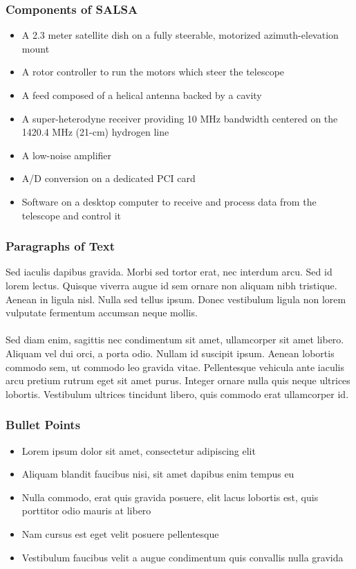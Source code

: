 \documentclass{beamer}
\begin{document}
\begin{frame}
\frametitle{Components of SALSA}
\begin{itemize}
\item A 2.3 meter satellite dish on a fully steerable, motorized azimuth-elevation mount
\item A rotor controller to run the motors which steer the telescope
\item A feed composed of a helical antenna backed by a cavity
\item A super-heterodyne receiver providing 10 MHz bandwidth centered on the 1420.4 MHz (21-cm) hydrogen line
\item A low-noise amplifier
\item A/D conversion on a dedicated PCI card
\item Software on a desktop computer to receive and process data from the telescope and control it
\end{itemize}
\end{frame}

\begin{frame}
\frametitle{Paragraphs of Text}
Sed iaculis dapibus gravida. Morbi sed tortor erat, nec interdum arcu. Sed id lorem lectus. Quisque viverra augue id sem ornare non aliquam nibh tristique. Aenean in ligula nisl. Nulla sed tellus ipsum. Donec vestibulum ligula non lorem vulputate fermentum accumsan neque mollis\cite{CJBakker1945}.\\~\\

Sed diam enim, sagittis nec condimentum sit amet, ullamcorper sit amet libero. Aliquam vel dui orci, a porta odio. Nullam id suscipit ipsum. Aenean lobortis commodo sem, ut commodo leo gravida vitae. Pellentesque vehicula ante iaculis arcu pretium rutrum eget sit amet purus. Integer ornare nulla quis neque ultrices lobortis. Vestibulum ultrices tincidunt libero, quis commodo erat ullamcorper id.
\end{frame}

\begin{frame}
\frametitle{Bullet Points}
\begin{itemize}
\item Lorem ipsum dolor sit amet, consectetur adipiscing elit
\item Aliquam blandit faucibus nisi, sit amet dapibus enim tempus eu
\item Nulla commodo, erat quis gravida posuere, elit lacus lobortis est, quis porttitor odio mauris at libero
\item Nam cursus est eget velit posuere pellentesque
\item Vestibulum faucibus velit a augue condimentum quis convallis nulla gravida
\end{itemize}
\end{frame}
\end{document}
